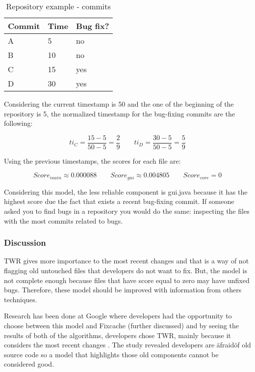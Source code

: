 \begin{table}[H]
    \begin{center}
        \caption{Repository example - commits}
        \label{table:repo_commits}
        \begin{tabular}{ | l | l | l | }
            \hline
            Commit & Time & Bug fix? \\ \hline
            A & 5 & no \\ \hline
            B & 10 & no\\ \hline
            C & 15 & yes  \\ \hline
            D & 30 & yes  \\ \hline
        \end{tabular}
    \end{center}
\end{table}
Considering the current timestamp is 50 and the one of the beginning of the
repository is 5, the normalized timestamp for the bug-fixing commits are the
following:

\begin{equation}
ti_C = \frac{15 - 5}{50 - 5} = \frac{2}{9}\qquad
ti_D = \frac{30 - 5}{50 - 5} = \frac{5}{9}
\end{equation}

Using the previous timestamps, the scores for each file are:

\begin{equation}
Score_{main} \approx 0.000088 \qquad
Score_{gui} \approx 0.004805 \qquad
Score_{core} = 0
\end{equation}

Considering this model, the less reliable component is gui.java because it has
the highest score due the fact that exists a recent bug-fixing commit. If
someone asked you to find bugs in a repository you would do the same: inspecting
the files with the most commits related to bugs.

\subsubsection{Discussion}
TWR gives more importance to the most recent changes and that is a way of not
flagging old untouched files that developers do not want to fix. But, the
model is not complete enough because files that have score equal to zero may
have unfixed bugs. Therefore, these model should be improved with information
from others techniques.

Research has been done at Google where developers had the opportunity to choose
between this model and Fixcache (further discussed) and by seeing the results of
both of the algorithms, developers chose TWR, mainly because it considers the
most recent changes \cite{Chris2013}. The study revealed developers are
\"afraid\" of old source code so a model that highlights those old components
cannot be considered good.

